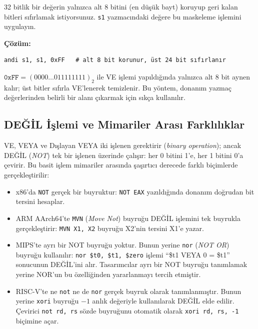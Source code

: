 \begin{ornek}[3.12]
32 bitlik bir değerin yalnızca alt 8 bitini (en düşük bayt) koruyup geri kalan bitleri sıfırlamak istiyorsunuz. \texttt{s1} yazmacındaki değere bu maskeleme işlemini uygulayın.

\textbf{Çözüm:}
\begin{lstlisting}[style=riscv]
andi s1, s1, 0xFF   # alt 8 bit korunur, üst 24 bit sıfırlanır
\end{lstlisting}

$\texttt{0xFF} = (0000\ldots011111111)_2$ ile VE işlemi yapıldığında yalnızca alt 8 bit aynen kalır; üst bitler sıfırla VE'lenerek temizlenir. Bu yöntem, donanım yazmaç değerlerinden belirli bir alanı çıkarmak için sıkça kullanılır.
\end{ornek}

\subsection{DEĞİL İşlemi ve Mimariler Arası Farklılıklar}
\label{sec:degil-islemi}

VE, VEYA ve Dışlayan VEYA iki işlenen gerektirir (\emph{binary operation}); ancak DEĞİL (\textit{NOT}) tek bir işlenen üzerinde çalışır: her 0 bitini 1'e, her 1 bitini 0'a çevirir. Bu basit işlem mimariler arasında şaşırtıcı derecede farklı biçimlerde gerçekleştirilir:

\begin{itemize}[nosep]
\item x86'da \texttt{NOT} gerçek bir buyruktur: \texttt{NOT EAX} yazıldığında donanım doğrudan bit tersini hesaplar.
\item ARM AArch64'te \texttt{MVN} (\emph{Move Not}) buyruğu DEĞİL işlemini tek buyrukla gerçekleştirir: \texttt{MVN X1, X2} buyruğu X2'nin tersini X1'e yazar.
\item MIPS'te ayrı bir NOT buyruğu yoktur. Bunun yerine \texttt{nor} (\emph{NOT OR}) buyruğu kullanılır: \texttt{nor \$t0, \$t1, \$zero} işlemi ``\$t1 VEYA 0 = \$t1'' sonucunun DEĞİL'ini alır. Tasarımcılar ayrı bir NOT buyruğu tanımlamak yerine NOR'un bu özelliğinden yararlanmayı tercih etmiştir.
\item RISC-V'te ne \texttt{not} ne de \texttt{nor} gerçek buyruk olarak tanımlanmıştır. Bunun yerine \texttt{xori} buyruğu $-1$ anlık değeriyle kullanılarak DEĞİL elde edilir. Çevirici \texttt{not rd, rs} sözde buyruğunu otomatik olarak \texttt{xori rd, rs, -1} biçimine açar.
\end{itemize}


